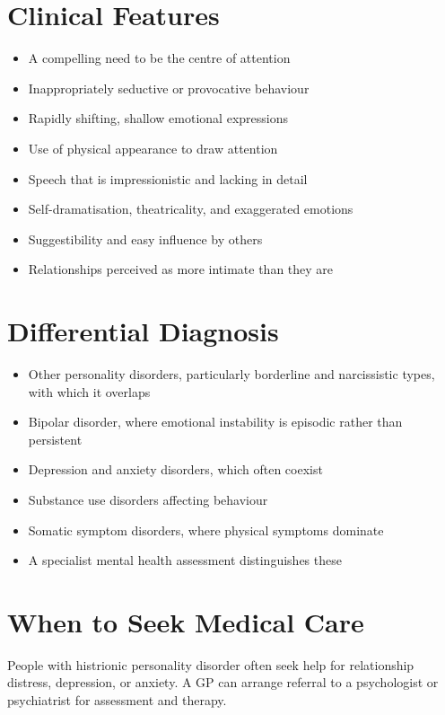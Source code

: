 \section*{Clinical Features}
\begin{itemize}
    \item A compelling need to be the centre of attention
    \item Inappropriately seductive or provocative behaviour
    \item Rapidly shifting, shallow emotional expressions
    \item Use of physical appearance to draw attention
    \item Speech that is impressionistic and lacking in detail
    \item Self-dramatisation, theatricality, and exaggerated emotions
    \item Suggestibility and easy influence by others
    \item Relationships perceived as more intimate than they are
\end{itemize}

\section*{Differential Diagnosis}
\begin{itemize}
    \item Other personality disorders, particularly borderline and narcissistic types, with which it overlaps
    \item Bipolar disorder, where emotional instability is episodic rather than persistent
    \item Depression and anxiety disorders, which often coexist
    \item Substance use disorders affecting behaviour
    \item Somatic symptom disorders, where physical symptoms dominate
    \item A specialist mental health assessment distinguishes these
\end{itemize}

\section*{When to Seek Medical Care}
People with histrionic personality disorder often seek help for relationship distress, depression, or anxiety. A GP can arrange referral to a psychologist or psychiatrist for assessment and therapy.

